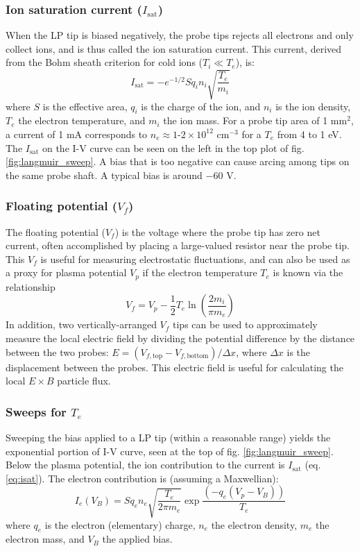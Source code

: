\subsubsection{Ion saturation current ($I_\text{sat}$)}
When the LP tip is biased negatively, the probe tips rejects all electrons and only collect ions, and is thus called the ion saturation current. This current, derived from the Bohm sheath criterion for cold ions ($T_i \ll T_e$), is: 
\begin{equation}
	I_\text{sat} = -e^{-1/2} S q_i n_i \sqrt{\frac{T_e}{m_i}}
	\label{eq:isat}
\end{equation}
where $S$ is the effective area, $q_i$ is the charge of the ion, and $n_i$ is the ion density, $T_e$ the electron temperature, and $m_i$ the ion mass.
For a probe tip area of 1 mm$^2$, a current of 1 mA corresponds to $n_e \approx 1\text{-}2\times 10^{12}$ cm$^{-3}$ for a $T_e$ from 4 to 1 eV. The $I_\text{sat}$ on the I-V curve can be seen on the left in the top plot of fig. \ref{fig:langmuir_sweep}. A bias that is too negative can cause arcing among tips on the same probe shaft. A typical bias is around $-60$ V. 

\subsubsection{Floating potential ($V_f$)}
The floating potential ($V_f$) is the voltage where the probe tip has zero net current, often accomplished by placing a large-valued resistor near the probe tip. This $V_f$ is useful for measuring electrostatic fluctuations, and can also be used as a proxy for plasma potential $V_p$ if the electron temperature $T_e$ is known via the relationship
\begin{equation}
	V_f = V_p - \frac{1}{2} T_e \ln \left( \frac{2 m_i}{\pi m_e} \right)
\end{equation}
In addition, two vertically-arranged $V_f$ tips can be used to approximately measure the local electric field by dividing the potential difference by the distance between the two probes: $E = (V_{f,\text{top}} - V_{f,\text{bottom}}) / \Delta x$, where $\Delta x$ is the displacement between the probes. This electric field is useful for calculating the local $E\times B$ particle flux.

\subsubsection{Sweeps for $T_e$}
Sweeping the bias applied to a LP tip (within a reasonable range) yields the exponential portion of I-V curve, seen at the top of fig. \ref{fig:langmuir_sweep}. Below the plasma potential, the ion contribution to the current is $I_\text{sat}$ (eq. \ref{eq:isat}). The electron contribution is (assuming a Maxwellian):
\begin{equation}
	I_e (V_B) = S q_e n_e \sqrt{\frac{T_e}{2 \pi m_e}} \exp \frac{(- q_e (V_p - V_B))}{T_e}
\end{equation}
where $q_e$ is the electron (elementary) charge, $n_e$ the electron density, $m_e$ the electron mass, and $V_B$ the applied bias.

